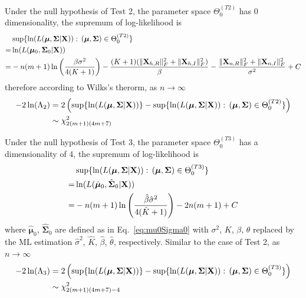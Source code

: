\documentclass[journal,draftcls,onecolumn,12pt,twoside]{IEEEtran}
\begin{document}
Under the null hypothesis of Test 2, the parameter space $\Theta_0^{(T2)}$ has 0
dimensionality, the supremum of log-likelihood is
\begin{align}
  & \sup \{\ln(L(\bm{\mu}, \mathbf{\Sigma}|\mathbf{X})):\,(\bm{\mu},
  \mathbf{\Sigma})\in \Theta_0^{(T2)}\} \notag \\
  = & \ln(L(\bm{\mu}_0,
  \mathbf{\Sigma}_0|\mathbf{X})) \notag \\
  = & -n(m+1)
  \ln\left(\frac{\beta \sigma^2}{4(K+1)}\right) -
  \frac{(K+1)(\|\mathbf{X}_{h,R}\|_F^2 + \|\mathbf{X}_{h,I}\|_F^2)}{\beta} -
  \frac{\|\mathbf{X}_{n,R}\|_F^2 + \|\mathbf{X}_{n,I}\|_F^2}{\sigma^2}
  + C
\end{align}
therefore according to Wilks's therorm, as $n\rightarrow\infty$ 
\begin{align}
  -2\ln(\Lambda_2) &= 2\left(\sup \{\ln(L(\bm{\mu},
  \mathbf{\Sigma}|\mathbf{X}))\} - \sup \{\ln(L(\bm{\mu}, \mathbf{\Sigma}|\mathbf{X})):\,(\bm{\mu},
  \mathbf{\Sigma})\in \Theta_0^{(T2)}\}\right) \notag \\
  &\sim \chi_{2(m+1)(4m+7)}^2
\end{align}

Under the null hypothesis of Test 3, the parameter space $\Theta_0^{(T3)}$
has a dimensionality of 4, the supremum of log-likelihood is
\begin{align}
  & \sup \{\ln(L(\bm{\mu}, \mathbf{\Sigma}|\mathbf{X})):\,(\bm{\mu},
  \mathbf{\Sigma})\in \Theta_0^{(T3)}\} \notag \\
  = & \ln(L(\hat{\bm{\mu}}_0,
  \hat{\mathbf{\Sigma}}_0|\mathbf{X})) \notag \\
  = & -n(m+1)\ln\left(\frac{\hat{\beta} \hat{\sigma}^2} {4(\hat{K}+1)}\right) -
    2n(m+1) + C
\end{align}
where $\hat{\bm{\mu}}_0 $, $\hat{\mathbf{\Sigma}}_0 $ are defined as in
Eq.~\eqref{eq:mu0Sigma0} with $\sigma^2$, $K$, $\beta$, $\theta$ replaced by
the ML estimation $\hat{\sigma}^2$, $\hat{K}$,
$\hat{\beta}$, $\hat{\theta}$, respectively. Similar to the case of Test 2,
as $n\rightarrow\infty$
\begin{align}
  -2\ln(\Lambda_3) &= 2\left(\sup \{\ln(L(\bm{\mu},
  \mathbf{\Sigma}|\mathbf{X}))\} - \sup \{\ln(L(\bm{\mu}, \mathbf{\Sigma}|\mathbf{X})):\,(\bm{\mu},
  \mathbf{\Sigma})\in \Theta_0^{(T3)}\}\right) \notag \\
  &\sim \chi_{2(m+1)(4m+7) - 4}^2
\end{align}




\end{document}

